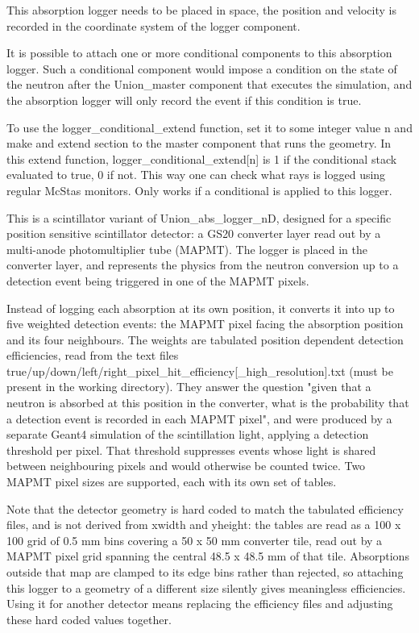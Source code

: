 This absorption logger needs to be placed in space, the position and velocity is recorded in the coordinate system of the logger component.

It is possible to attach one or more conditional components to this absorption logger. Such a conditional component would impose a condition on the state of the neutron after the Union\_master component that executes the simulation, and the absorption logger will only record the event if this condition is true.

To use the logger\_conditional\_extend function, set it to some integer value n and make and extend section to the master component that runs the geometry. In this extend function, logger\_conditional\_extend[n] is 1 if the conditional stack evaluated to true, 0 if not. This way one can check what rays is logged using regular McStas monitors. Only works if a conditional is applied to this logger.

This is a scintillator variant of Union\_abs\_logger\_nD, designed for a specific position sensitive scintillator detector: a GS20 converter layer read out by a multi-anode photomultiplier tube (MAPMT). The logger is placed in the converter layer, and represents the physics from the neutron conversion up to a detection event being triggered in one of the MAPMT pixels.

Instead of logging each absorption at its own position, it converts it into up to five weighted detection events: the MAPMT pixel facing the absorption position and its four neighbours. The weights are tabulated position dependent detection efficiencies, read from the text files true/up/down/left/right\_pixel\_hit\_efficiency[\_high\_resolution].txt (must be present in the working directory). They answer the question "given that a neutron is absorbed at this position in the converter, what is the probability that a detection event is recorded in each MAPMT pixel", and were produced by a separate Geant4 simulation of the scintillation light, applying a detection threshold per pixel. That threshold suppresses events whose light is shared between neighbouring pixels and would otherwise be counted twice. Two MAPMT pixel sizes are supported, each with its own set of tables.

Note that the detector geometry is hard coded to match the tabulated efficiency files, and is not derived from xwidth and yheight: the tables are read as a 100 x 100 grid of 0.5 mm bins covering a 50 x 50 mm converter tile, read out by a MAPMT pixel grid spanning the central 48.5 x 48.5 mm of that tile. Absorptions outside that map are clamped to its edge bins rather than rejected, so attaching this logger to a geometry of a different size silently gives meaningless efficiencies. Using it for another detector means replacing the efficiency files and adjusting these hard coded values together.

